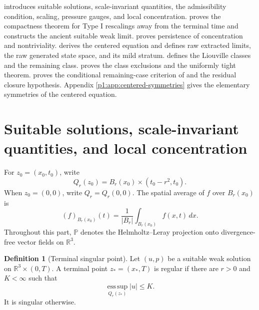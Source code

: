 \documentclass[11pt]{amsart}
\theoremstyle{plain}
\theoremstyle{definition}
\newtheorem{definition}[definition]{Definition}
\theoremstyle{remark}
\numberwithin{equation}{section}
\newcommand{\R}{\mathbb R}
\newcommand{\esssup}{\operatorname*{ess\,sup}}
\begin{document}
 introduces suitable solutions, scale-invariant quantities,
the admissibility condition, scaling, pressure gauges, and local concentration.
 proves the compactness theorem for Type I
rescalings away from the terminal time and constructs the ancient suitable
weak limit.   proves persistence of concentration and
nontriviality.   derives the centered equation and defines
raw extracted limits, the raw generated state space, and its mild stratum.
 defines the
Liouville classes and the remaining class.   proves the
class exclusions and the uniformly tight theorem.   proves
the conditional remaining-case criterion of
 and the residual closure hypothesis.
Appendix \ref{p1:app:centered-symmetries} gives
the elementary symmetries of the centered equation.

\section{Suitable solutions, scale-invariant quantities, and local concentration}
\label{p1:sec:prelim}

For \(z_0=(x_0,t_0)\), write
\[
   Q_r(z_0)=B_r(x_0)\times(t_0-r^2,t_0).
\]
When \(z_0=(0,0)\), write \(Q_r=Q_r(0,0)\).  The spatial average of \(f\) over
\(B_r(x_0)\) is
\[
   (f)_{B_r(x_0)}(t)=\frac1{|B_r|}\int_{B_r(x_0)}f(x,t)\,dx.
\]
Throughout this part, \(\mathbb P\) denotes the Helmholtz--Leray projection
onto divergence-free vector fields on \(\R^3\).

\begin{definition}[Terminal singular point]\label{p1:def:terminal-singular}
Let \((u,p)\) be a suitable weak solution on \(\R^3\times(0,T)\).  A terminal
point \(z_*=(x_*,T)\) is regular if there are \(r>0\) and \(K<\infty\) such
that
\[
   \esssup_{Q_r(z_*)}|u|\le K.
\]
It is singular otherwise.
\end{definition}
\end{document}
